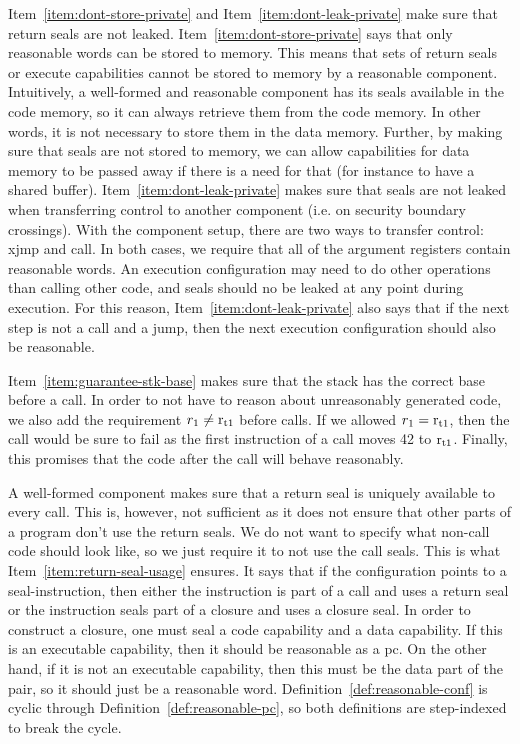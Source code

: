 \documentclass[acmsmall,screen]{acmart}\settopmatter{}
\newenvironment{jversion}%
    {\color{OliveGreen}}{}
\begin{document}
\begin{jversion}
Item~\ref{item:dont-store-private} and Item~\ref{item:dont-leak-private} make sure that return seals are not leaked.
Item~\ref{item:dont-store-private} says that only reasonable words can be stored to memory.
This means that sets of return seals or execute capabilities cannot be stored to memory by a reasonable component.
Intuitively, a well-formed and reasonable component has its seals available in the code memory, so it can always retrieve them from the code memory.
In other words, it is not necessary to store them in the data memory.
Further, by making sure that seals are not stored to memory, we can allow capabilities for data memory to be passed away if there is a need for that (for instance to have a shared buffer).
Item~\ref{item:dont-leak-private} makes sure that seals are not leaked when transferring control to another component (i.e. on security boundary crossings).
With the component setup, there are two ways to transfer control: xjmp and call.
In both cases, we require that all of the argument registers contain reasonable words.
An execution configuration may need to do other operations than calling other code, and seals should no be leaked at any point during execution.
For this reason, Item~\ref{item:dont-leak-private} also says that if the next step is not a call and a jump, then the next execution configuration should also be reasonable.

Item~\ref{item:guarantee-stk-base} makes sure that the stack has the correct base before a call.
In order to not have to reason about unreasonably generated code, we also add the requirement $r_1 \neq \mathrm{r}_\mathrm{t1}$ before calls.
If we allowed $r_1=\mathrm{r}_\mathrm{t1}$, then the call would be sure to fail as the first instruction of a call moves 42 to $\mathrm{r}_\mathrm{t1}$.
Finally, this promises that the code after the call will behave reasonably.

A well-formed component makes sure that a return seal is uniquely available to every call.
This is, however, not sufficient as it does not ensure that other parts of a program don't use the return seals.
We do not want to specify what non-call code should look like, so we just require it to not use the call seals.
This is what Item~\ref{item:return-seal-usage} ensures.
It says that if the configuration points to a seal-instruction, then either the instruction is part of a call and uses a return seal or the instruction seals part of a closure and uses a closure seal.
In order to construct a closure, one must seal a code capability and a data capability.
If this is an executable capability, then it should be reasonable as a pc.
On the other hand, if it is not an executable capability, then this must be the data part of the pair, so it should just be a reasonable word.
Definition~\ref{def:reasonable-conf} is cyclic through Definition~\ref{def:reasonable-pc}, so both definitions are step-indexed to break the cycle.


\end{jversion}
\end{document}
